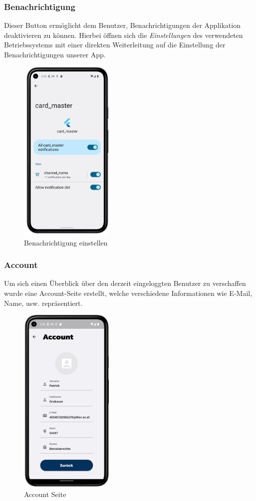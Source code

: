 \subsubsection{Benachrichtigung}
Dieser Button ermöglicht dem Benutzer, Benachrichtigungen der Applikation deaktivieren zu können. Hierbei öffnen sich die {\textit{Einstellungen}} des verwendeten Betriebssystems mit einer direkten Weiterleitung auf die Einstellung der Benachrichtigungen unserer App.
\begin{figure}[!h]
\centering
\includegraphics[width=0.4\textwidth]{FLUTTER/images/GP/Notification.png}
\caption{Benachrichtigung einstellen}
\end{figure}
\newpage

\subsubsection{Account}
Um sich einen Überblick über den derzeit eingeloggten Benutzer zu verschaffen wurde eine Account-Seite erstellt, welche verschiedene Informationen wie E-Mail, Name, usw. repräsentiert.
\begin{figure}[!h]
\centering
\includegraphics[width=0.4\textwidth]{FLUTTER/images/GP/Account.png}
\caption{Account Seite}
\end{figure}

